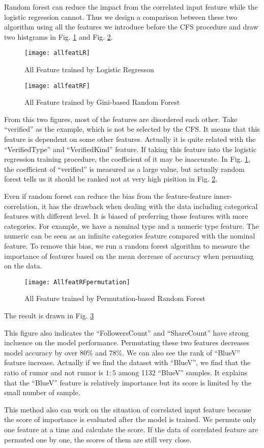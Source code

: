 Random forest can reduce the impact from the correlated input feature while the logistic regression cannot. Thus we design a comparison between these two algorithm using all the features we introduce before the CFS procedure and draw two histgrams in Fig. \ref{fig:allFeatbyLR} and Fig. \ref{fig:allFeatbyRF}.
\clearpage
\begin{figure}[t]\centering
\texttt{[image: allfeatLR]}
\caption{All Feature trained by Logistic Regresson} \label{fig:allFeatbyLR} \end{figure}

\begin{figure}[h]\centering
\texttt{[image: allfeatRF]}
\caption{All Feature trained by Gini-based Random Forest} \label{fig:allFeatbyRF} \end{figure}

\clearpage
From this two figures, most of the features are disordered each other. Take ``verified'' as the example, which is not be selected by the CFS. It means that this feature is dependent on some other features. Actually it is quite related with the ``VerifiedType'' and ``VerifiedKind'' feature. If taking this feature into the logistic regression training procedure, the coefficient of it may be inaccurate. In Fig. \ref{fig:allFeatbyLR}, the coefficient of ``verified'' is measured as a large value, but actually random forest tells us it should be ranked not at very high pisition in Fig. \ref{fig:allFeatbyRF}.

Even if random forest can reduce the bias from the feature-feature inner-correlation, it has the drawback when dealing with the data including categorical features with different level. It is biased of preferring those features with more categories. For example, we have a nominal type and a numeric type feature. The numeric can be seen as an infinite categories feature compared with the nominal feature. To remove this bias, we run a random forest algorithm to measure the importance of features based on the mean decrease of accuracy when permuting on the data.
\begin{figure}[h]\centering
\texttt{[image: AllfeatRFpermutation]}
\caption{All Feature trained by Permutation-based Random Forest} \label{fig:ImptbyRFpermutation} \end{figure}

The result is drawn in Fig. \ref{fig:ImptbyRFpermutation}


This figure also indicates the ``FollowersCount'' and ``ShareCount'' have strong incluence on the model performance. Permutating these two features decreases model accuracy by over 80\% and 78\%. We can also see the rank of ``BlueV'' feature increase. Actually if we find the dataset with ``BlueV'', we find that the ratio of rumor and not rumor is $1:5$ among 1132 ``BlueV'' samples. It explains that the ``BlueV'' feature is relatively importance but its score is limited by the small number of sample. 

This method also can work on the situation of correlated input feature because the score of importance is evaluated after the model is trained. We permute only one feature at a time and calculate the score. If the data of correlated feature are permuted one by one, the scores of them are still very close.
